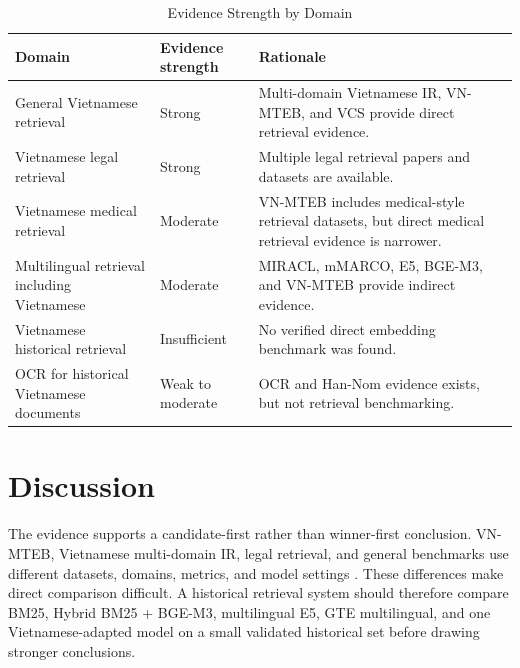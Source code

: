 \documentclass[11pt]{article}
\begin{document}
\begin{table}[H]
\centering
\caption{Evidence Strength by Domain}
\label{tab:evidence-domain}
\small
\begin{tabularx}{\textwidth}{p{}p{}Y}
\toprule
Domain & Evidence strength & Rationale \\
\midrule
General Vietnamese retrieval & Strong & Multi-domain Vietnamese IR, VN-MTEB, and VCS provide direct retrieval evidence. \\
Vietnamese legal retrieval & Strong & Multiple legal retrieval papers and datasets are available. \\
Vietnamese medical retrieval & Moderate & VN-MTEB includes medical-style retrieval datasets, but direct medical retrieval evidence is narrower. \\
Multilingual retrieval including Vietnamese & Moderate & MIRACL, mMARCO, E5, BGE-M3, and VN-MTEB provide indirect evidence. \\
Vietnamese historical retrieval & Insufficient & No verified direct embedding benchmark was found. \\
OCR for historical Vietnamese documents & Weak to moderate & OCR and Han-Nom evidence exists, but not retrieval benchmarking. \\
\bottomrule
\end{tabularx}
\end{table}

\section{Discussion}
The evidence supports a candidate-first rather than winner-first conclusion. VN-MTEB, Vietnamese multi-domain IR, legal retrieval, and general benchmarks use different datasets, domains, metrics, and model settings \cite{pham-etal-2026-vn,nguyen-quan-2026-works,thakur-etal-2021-beir}. These differences make direct comparison difficult. A historical retrieval system should therefore compare BM25, Hybrid BM25 + BGE-M3, multilingual E5, GTE multilingual, and one Vietnamese-adapted model on a small validated historical set before drawing stronger conclusions.
\end{document}
